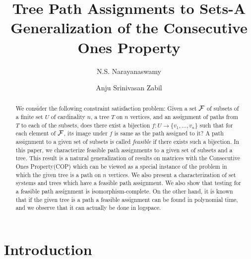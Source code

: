 \documentclass{llncs}
\def\cF{{\cal F}}
\begin{document}
\title{Tree Path Assignments to Sets-A Generalization of the Consecutive Ones Property}

\author{N.S. Narayanaswamy  \and Anju Srinivasan Zabil }



\date{}

\maketitle

\begin{abstract}
  We consider the following constraint satisfaction problem: Given a
  set $\cF$ of subsets of a finite set $U$ of cardinality $n$, a tree
  $T$ on $n$ vertices, and an assignment of paths from $T$ to each of
  the subsets, does there exist a bijection $f:U \rightarrow
  \{v_1,\ldots,v_n\}$ such that for each element of $\cF$, its image
  under $f$ is same as the path assigned to it?  A path assignment to
  a given set of subsets is called {\em feasible} if there exists such
  a bijection.  In this paper, we characterize feasible path
  assignments to a given set of subsets and a tree.  This result is a
  natural generalization of results on matrices with the Consecutive
  Ones Property(COP) which can be viewed as a special instance of the
  problem in which the given tree is a path on $n$ vertices.  We also
  present a characterization of set systems and trees which have a
  feasible path assignment.  We also show that testing for a feasible
  path assignment is isomorphism-complete.  On the other hand, it is
  known that if the given tree is a path a feasible assignment can be
  found in polynomial time, and we observe that it can actually be
  done in logspace.
\end{abstract}

\section{Introduction}
\end{document}
